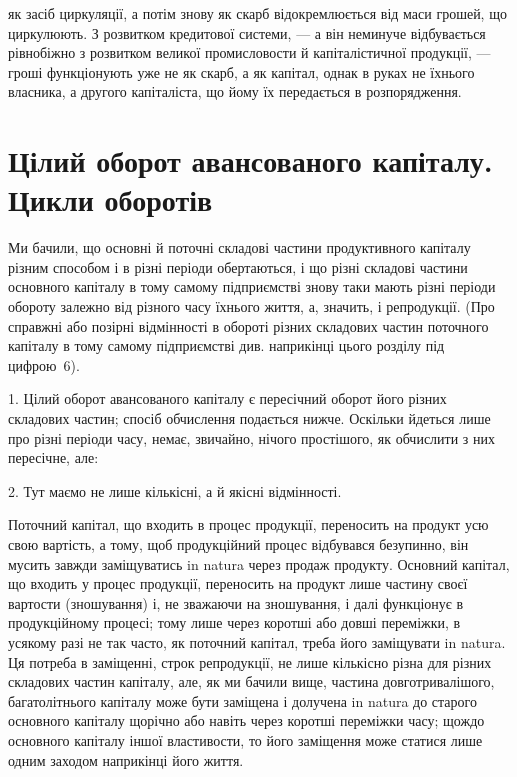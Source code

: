 \parcont{}  %
як засіб циркуляції, а потім знову як скарб відокремлюється від маси
грошей, що циркулюють. З розвитком кредитової системи, — а він неминуче
відбувається рівнобіжно з розвитком великої промисловости й капіталістичної
продукції, — гроші функціонують уже не як скарб, а як капітал,
однак в руках не їхнього власника, а другого капіталіста, що йому
їх передається в розпорядження.

\section{Цілий оборот авансованого капіталу. Цикли
оборотів}

Ми бачили, що основні й поточні складові частини продуктивного
капіталу різним способом і в різні періоди обертаються, і що різні складові
частини основного капіталу в тому самому підприємстві знову таки
мають різні періоди обороту залежно від різного часу їхнього життя, а,
значить, і репродукції. (Про справжні або позірні відмінності в обороті
різних складових частин поточного капіталу в тому самому підприємстві
див. наприкінці цього розділу під цифрою~6).

1. Цілий оборот авансованого капіталу є пересічний оборот його різних
складових частин; спосіб обчислення подається нижче. Оскільки
йдеться лише про різні періоди часу, немає, звичайно, нічого простішого,
як обчислити з них пересічне, але:

2. Тут маємо не лише кількісні, а й якісні відмінності.

Поточний капітал, що входить в процес продукції, переносить на
продукт усю свою вартість, а тому, щоб продукційний процес відбувався
безупинно, він мусить завжди заміщуватись in natura через продаж
продукту. Основний капітал, що входить у процес продукції, переносить
на продукт лише частину своєї вартости (зношування) і, не зважаючи на
зношування, і далі функціонує в продукційному процесі; тому лише через
коротші або довші переміжки, в усякому разі не так часто, як поточний
капітал, треба його заміщувати in natura. Ця потреба в заміщенні, строк
репродукції, не лише кількісно різна для різних складових частин капіталу,
але, як ми бачили вище, частина довготривалішого, багатолітнього
капіталу може бути заміщена і долучена in natura до старого основного
капіталу щорічно або навіть через коротші переміжки часу; щождо основного
капіталу іншої властивости, то його заміщення може статися лише
одним заходом наприкінці його життя.

